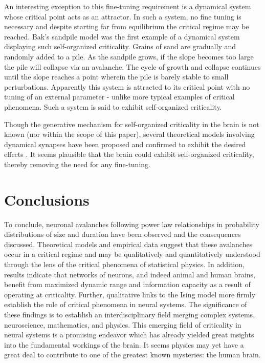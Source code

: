 \documentclass[12pt]{article}
\begin{document}
An interesting exception to this fine-tuning requirement is a dynamical system whose critical point acts as an attractor. In such a system, no fine tuning is necessary and despite starting far from equilibrium the critical regime may be reached. Bak's sandpile model\cite{Bak1987a} was the first example of a dynamical system displaying such self-organized criticality. Grains of sand are gradually and randomly added to a pile. As the sandpile grows, if the slope becomes too large the pile will collapse via an avalanche. The cycle of growth and collapse continues until the slope reaches a point wherein the pile is barely stable to small perturbations. Apparently this system is attracted to its critical point with no tuning of an external parameter - unlike more typical examples of critical phenomena. Such a system is said to exhibit self-organized criticality.
   
Though the generative mechanism for self-organized criticality in the brain is not known (nor within the scope of this paper), several theoretical models involving dynamical synapses have been proposed and confirmed to exhibit the desired effects \cite{Levina2007a, Levina2009a, Bornholdt2003a, Rybarsch2014a}. It seems plausible that the brain could exhibit self-organized criticality, thereby removing the need for any fine-tuning.

\section*{Conclusions}

To conclude, neuronal avalanches following power law relationships in probability distributions of size and duration have been observed and the consequences discussed. Theoretical models and empirical data suggest that these avalanches occur in a critical regime and may be qualitatively and quantitatively understood through the lens of the critical phenomena of statistical physics. In addition, results indicate that networks of neurons, and indeed animal and human brains, benefit from maximized dynamic range and information capacity as a result of operating at criticality. Further, qualitative links to the Ising model more firmly establish the role of critical phenomena in neural systems. The significance of these findings is to establish an interdisciplinary field merging complex systems, neuroscience, mathematics, and physics. This emerging field of criticality in neural systems is a promising endeavor which has already yielded great insights into the fundamental workings of the brain. It seems physics may yet have a great deal to contribute to one of the greatest known mysteries: the human brain. 



{\small
}
\end{document}
